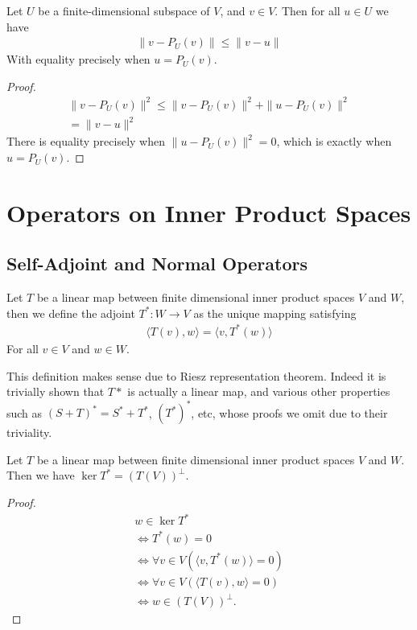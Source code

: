 \documentclass[]{article}
\begin{document}
\begin{thm}
		Let $U$ be a finite-dimensional subspace of $V$, and $v \in V$. Then for all $u \in U$ we have
		\begin{align*}
				\|v - P_U(v)\| \leq \|v - u\|	
		\end{align*}
		With equality precisely when $u = P_U(v)$.
\end{thm}

\begin{proof}
		\begin{align*}
				\|v - P_U(v)\|^2 \leq \|v - P_U(v)\|^2 + \|u - P_U(v)\|^2 \\
				= \|v - u\|^2
		\end{align*}
		There is equality precisely when $\|u - P_U(v)\|^2 = 0$, which is exactly when $u = P_U(v)$.
\end{proof}

\section{Operators on Inner Product Spaces}

\subsection{Self-Adjoint and Normal Operators}

\begin{defi} [Adjoint]
		Let $T$ be a linear map between finite dimensional inner product spaces $V$ and $W$, then we define the adjoint $T^*: W \to V$ as the unique mapping satisfying
		\begin{align*}
				\langle T(v), w \rangle  = \langle v, T^*(w) \rangle 
		\end{align*}
		For all $v \in V$ and $w \in W$.
\end{defi}

This definition makes sense due to Riesz representation theorem. Indeed it is trivially shown that $T*$ is actually a linear map, and various other properties such as $(S+T)^* = S^* + T^*$, $(T^*)^*$, etc, whose proofs we omit due to their triviality.

\begin{thm}
		Let $T$ be a linear map between finite dimensional inner product spaces $V$ and $W$. Then we have $\ker T^* = (T(V))^{\perp}$.
\end{thm}

\begin{proof}
		\begin{align*}
				w \in \ker T^* \\
				\iff T^*(w) = 0 \\
				\iff \forall v \in V (\langle v, T^*(w) \rangle = 0) \\
				\iff \forall v \in V (\langle T(v), w \rangle = 0) \\
				\iff w \in (T(V))^{\perp}.
		\end{align*}
\end{proof}
\end{document}
